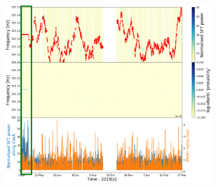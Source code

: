 \begin{figure}[hpt]
\begin{subfigure}[h]{0.49\textwidth}
	\includegraphics[width=\textwidth]{C6_detchar/linemixing/track_F315_15_315_25.pdf}
	\caption{\label{detchar:soap:calibrationlinemixing:2}}
\end{subfigure}


\end{figure}
